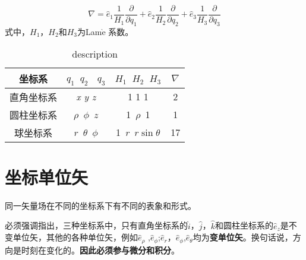\[
\nabla =\hat{e}_1\frac{1}{H_1}\frac{\partial}{\partial q_1}+\hat{e}_2\frac{1}{H_2}\frac{\partial}{\partial q_2}+\hat{e}_3\frac{1}{H_3}\frac{\partial}{\partial q_3}
\]
式中，$ H_1 $，$ H_2 $和$ H_3 $为Lam$\grave{\text{e}}$ 系数。

%	
%			
%		


\begin{table}
	\centering
	\caption{description}
	\begin{spacing}{2.5}		
	\begin{tabular}{cccc}
		\toprule  %
		
		
		坐标系& $ q_1$\ $ q_2$ \  $ q_3 $& $ H_1$\ $ H_2$\ $ H_3$& $ \nabla $\\
		\midrule  
		直角坐标系& \textit{x y z}& 1 1 1 &2\\
		圆柱坐标系& $\rho$\ $ \phi$\ $ z$& 1\ $ \rho $\ 1&1\\
		球坐标系  & $r$\ $\theta$\ $\phi$&1\ $r$\  $r\sin\theta$&17\\
		
		
		
		\bottomrule %
	\end{tabular}
	\end{spacing}
\end{table}

\section{坐标单位矢}
同一矢量场在不同的坐标系下有不同的表象和形式。

\begin{newdef}[]
必须强调指出，三种坐标系中，只有直角坐标系的$ \hat{i} $，$ \hat{j} $，$ \hat{k} $和圆柱坐标系的$ \hat{e}_z $是不变单位矢，其他的各种单位矢，例如$ \hat{e}_\rho $
,$ \hat{e}_\phi $;$ \hat{e}_r $，$ \hat{e}_\phi $,$ \hat{e}_\theta $均为\textbf{变单位矢}。换句话说，方向是时刻在变化的。\textbf{因此必须参与微分和积分}。
\end{newdef}






